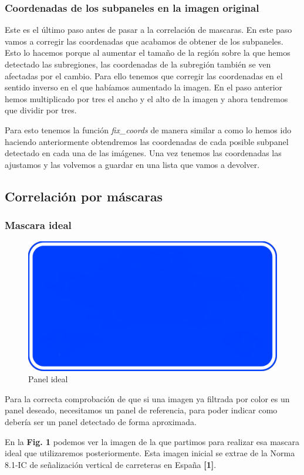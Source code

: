 \documentclass[a4paper, 12pt]{article}
\begin{document}
\subsubsection{Coordenadas de los subpaneles en la imagen original}
Este es el último paso antes de pasar a la correlación de mascaras. En este paso vamos a corregir las coordenadas que acabamos de obtener de los subpaneles. Esto lo hacemos porque al aumentar el tamaño de la región sobre la que hemos detectado las subregiones, las coordenadas de la subregión también se ven afectadas por el cambio. Para ello tenemos que corregir las coordenadas en el sentido inverso en el que habíamos aumentado la imagen. En el paso anterior hemos multiplicado por tres el ancho y el alto de la imagen y ahora tendremos que dividir por tres. 

Para esto tenemos la función \textit{fix\_coords} de manera similar a como lo hemos ido haciendo anteriormente obtendremos las coordenadas de cada posible subpanel detectado en cada una de las imágenes. Una vez tenemos las coordenadas las ajustamos y las volvemos a guardar en una lista que vamos a devolver. 


\subsection{Correlación por máscaras}
\subsubsection{Mascara ideal}

\begin{figure}[h]
	\centering
	\includegraphics[width=0.4\linewidth]{img/ideal_mask}
	\caption{Panel ideal}
	\label{fig:idealmask}
\end{figure}

Para la correcta comprobación de que si una imagen ya filtrada por color es un panel deseado, necesitamos un panel de referencia, para poder indicar como debería ser un panel detectado de forma aproximada.


En la \textbf{Fig. 1} podemos ver la imagen de la que partimos para realizar esa mascara ideal que utilizaremos posteriormente. Esta imagen inicial se extrae de la Norma 8.1-IC de señalización vertical de carreteras en España \textbf{[1]}.
\end{document}
